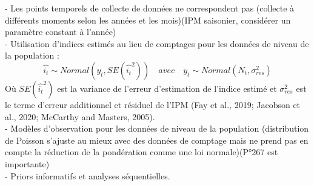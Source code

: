 \documentclass[12pt,a4paper]{article}
\begin{document}
- Les points temporels de collecte de données ne correspondent pas (collecte à différents moments selon les années et les mois)(IPM saisonier, considérer un paramètre constant à l'année)\\
- Utilisation d'indices estimés au lieu de comptages pour les données de niveau de la population : \\
\begin{equation}
\hat{i_t}\sim Normal(y_{t}, SE(\hat{i_t}^2)) \quad avec \quad y_{t} \sim Normal(N_{t}, \sigma^2_{res})
\end{equation}
Où $SE(\hat{i_t}^2)$ est la variance de l'erreur d'estimation de l'indice estimé et $\sigma^2_{res}$ est le terme d'erreur additionnel et résiduel de l'IPM (Fay et al., 2019; Jacobson et al., 2020; McCarthy and Masters, 2005).\\
- Modèles d'observation pour les données de niveau de la population (distribution de Poisson s'ajuste au mieux avec des données de comptage mais ne prend pas en compte la réduction de la pondération comme une loi normale)(P°267 est importante) \\
- Priors informatifs et analyses séquentielles.
\end{document}
